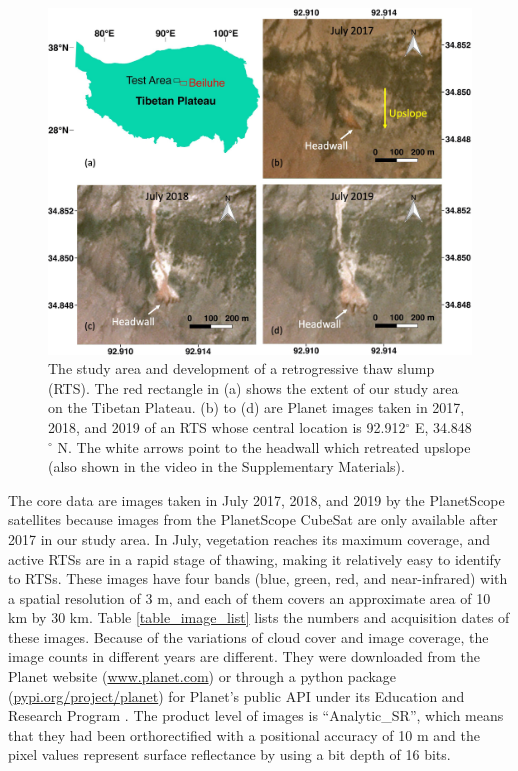 \documentclass[authoryear,preprint,review,12pt]{elsarticle}
\begin{document}
\begin{figure} 
	\centering
	\includegraphics[width=14cm]{figs/rts_multi_images_study_area_v2_trim.jpg}
	\caption{The study area and development of a retrogressive thaw slump (RTS). The red 
	rectangle in (a) shows the extent of our study area
	on the Tibetan Plateau. (b) to (d) are Planet images taken in 2017, 2018, and 2019 of an RTS whose central location is 92.912$^\circ$ E, 34.848$^\circ$ N. The white arrows point to the headwall which retreated upslope (also shown in the video in the Supplementary Materials).} %
	\label{fig_multi_rts_image_studyarea}
\end{figure}


The core data are images taken in July 2017, 2018, and 2019 by the PlanetScope satellites because images from the PlanetScope CubeSat are only available after 2017 in our study area.  
In July, vegetation reaches its maximum coverage, and active RTSs are in a rapid stage of thawing, making it relatively easy to identify to RTSs.
These images have four bands (blue, green, red, and near-infrared) with a spatial resolution of 3 m, and each of them covers an approximate area of 10 km by 30 km.
Table \ref{table_image_list} lists the numbers and acquisition dates of these images. 
Because of the variations of cloud cover and image coverage, the image counts in different years are different.
They were downloaded from the Planet website (\url{www.planet.com}) or through a python package (\url{pypi.org/project/planet}) for Planet's public API under its Education and Research Program \citep{team2018planet}. 
The product level of images is ``Analytic\_SR'', which means that they had been orthorectified with a positional accuracy of 10 m and the pixel values represent surface reflectance by using a bit depth of 16 bits. 
\end{document}
